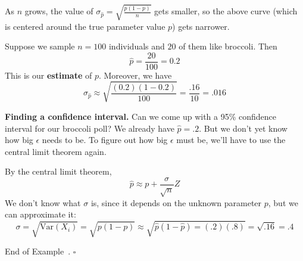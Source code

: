 \documentclass[10pt]{article}
\theoremstyle{definition}
\newtheorem{example}[theorem]{Example}
\renewenvironment{example}
{\begin{oldexample}}
  {\par\smallskip\hfill   End of Example~\theexample. $\square$    \par\end{oldexample}}
\newcommand{\vt}{\vskip 5mm} %
\newcommand{\Fl}{\vt\noindent\textbf} %
\newcommand{\1}[1]{\textbf{1}_{\left[#1\right]}} %
\def\Var{\mathrm{Var}} %
\begin{document}
\begin{example}[Broccoli Poll]
  \begin{center}
  \end{center}
  As $n$ grows, the value of $\sigma_{\widehat{p}}=\sqrt{\frac{p(1-p)}{n}}$
  gets smaller, so the above curve (which is centered around the true
  parameter value $p$) gets narrower.

  Suppose we sample $n=100$ individuals and $20$ of them like broccoli. Then
  \begin{equation*}
    \widehat{p} = \frac{20}{100}=0.2
  \end{equation*}
  This is our \textbf{estimate} of $p$. Moreover, we have
  \begin{equation*}
    \sigma_{\widehat{p}} \approx \sqrt{\frac{(0.2)(1-0.2)}{100}} = \frac{.16}{10} = .016
  \end{equation*}


  \Fl{Finding a confidence interval.} Can we come up with a 95\% confidence
  interval for our broccoli poll? We already have $\widehat{p}=.2$. But we
  don't yet know how big $\epsilon$ needs to be. To figure out how big
  $\epsilon$ must be, we'll have to use the central limit theorem again.

  By the central limit theorem,
  \begin{equation}\label{eq:25}
    \widehat{p} \approx p + \frac{\sigma}{\sqrt{n}}Z
  \end{equation}
  We don't know what $\sigma$ is, since it depends on the unknown parameter
  $p$, but we can approximate it:
  \begin{equation}\label{eq:26}
    \sigma = \sqrt{\Var(X_{i})} = \sqrt{p(1-p)} \approx \sqrt{\widehat{p}(1-\widehat{p})=(.2)(.8)}=\sqrt{.16} = .4
  \end{equation}


\end{example}
\end{document}
